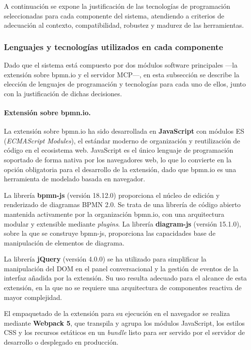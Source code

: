 A continuación se expone la justificación de las tecnologías de programación seleccionadas para cada componente del sistema, atendiendo a criterios de adecuación al contexto, compatibilidad, robustez y madurez de las herramientas.

\subsubsection{Lenguajes y tecnologías utilizados en cada componente}

Dado que el sistema está compuesto por dos módulos software principales —la extensión sobre bpmn.io y el servidor MCP—, en esta subsección se describe la elección de lenguajes de programación y tecnologías para cada uno de ellos, junto con la justificación de dichas decisiones.

\paragraph{Extensión sobre bpmn.io.}

La extensión sobre bpmn.io ha sido desarrollada en \textbf{JavaScript} con módulos ES (\textit{ECMAScript Modules}), el estándar moderno de organización y reutilización de código en el ecosistema web. JavaScript es el único lenguaje de programación soportado de forma nativa por los navegadores web, lo que lo convierte en la opción obligatoria para el desarrollo de la extensión, dado que bpmn.io es una herramienta de modelado basada en navegador.

La librería \textbf{bpmn-js} (versión 18.12.0) proporciona el núcleo de edición y renderizado de diagramas BPMN 2.0. Se trata de una librería de código abierto mantenida activamente por la organización bpmn.io, con una arquitectura modular y extensible mediante \textit{plugins}. La librería \textbf{diagram-js} (versión 15.1.0), sobre la que se construye bpmn-js, proporciona las capacidades base de manipulación de elementos de diagrama.

La librería \textbf{jQuery} (versión 4.0.0) se ha utilizado para simplificar la manipulación del DOM en el panel conversacional y la gestión de eventos de la interfaz añadida por la extensión. Su uso resulta adecuado para el alcance de esta extensión, en la que no se requiere una arquitectura de componentes reactiva de mayor complejidad.

El empaquetado de la extensión para su ejecución en el navegador se realiza mediante \textbf{Webpack 5}, que transpila y agrupa los módulos JavaScript, los estilos CSS y los recursos estáticos en un \textit{bundle} listo para ser servido por el servidor de desarrollo o desplegado en producción.

